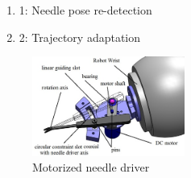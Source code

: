 \begin{enumerate}
\item{1}: Needle pose re-detection
\item{2}: Trajectory adaptation
\end{enumerate}

\begin{figure}
\centering
{
\includegraphics[width=5cm]{./fig/needledriver.jpg}
\caption{\scriptsize{Motorized needle driver}}

\label{fig:overview}
}
\end{figure}

